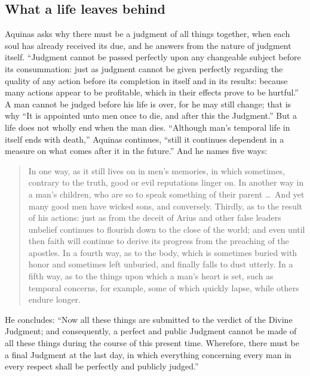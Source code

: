 \subsection{What a life leaves behind}

Aquinas asks why there must be a judgment of all things together, when each soul has already received its due, and he answers from the nature of judgment itself. ``Judgment cannot be passed perfectly upon any changeable subject before its consummation: just as judgment cannot be given perfectly regarding the quality of any action before its completion in itself and in its results: because many actions appear to be profitable, which in their effects prove to be hurtful.'' A man cannot be judged before his life is over, for he may still change; that is why ``It is appointed unto men once to die, and after this the Judgment.'' But a life does not wholly end when the man dies. ``Although man's temporal life in itself ends with death,'' Aquinas continues, ``still it continues dependent in a measure on what comes after it in the future.'' And he names five ways:

\begin{quote}
In one way, as it still lives on in men's memories, in which sometimes, contrary to the truth, good or evil reputations linger on. In another way in a man's children, who are so to speak something of their parent \ldots\ And yet many good men have wicked sons, and conversely. Thirdly, as to the result of his actions: just as from the deceit of Arius and other false leaders unbelief continues to flourish down to the close of the world; and even until then faith will continue to derive its progress from the preaching of the apostles. In a fourth way, as to the body, which is sometimes buried with honor and sometimes left unburied, and finally falls to dust utterly. In a fifth way, as to the things upon which a man's heart is set, such as temporal concerns, for example, some of which quickly lapse, while others endure longer.
\end{quote}

He concludes: ``Now all these things are submitted to the verdict of the Divine Judgment; and consequently, a perfect and public Judgment cannot be made of all these things during the course of this present time. Wherefore, there must be a final Judgment at the last day, in which everything concerning every man in every respect shall be perfectly and publicly judged.''

